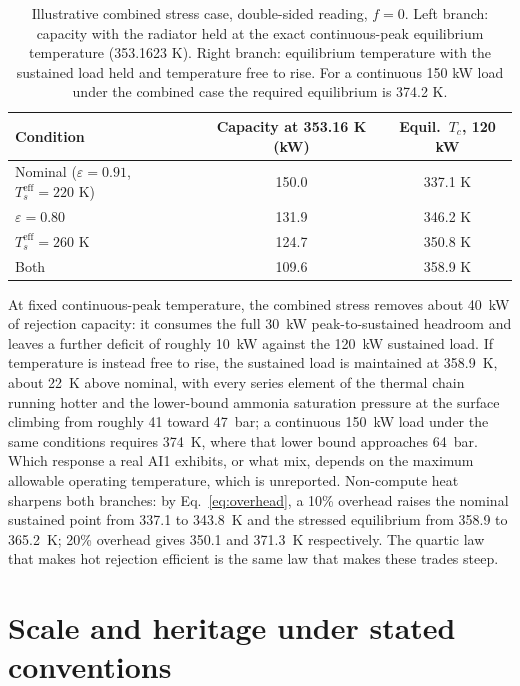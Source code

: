 \documentclass[11pt]{article}
\newcommand{\Tc}{T_c}
\newcommand{\Ts}{T_s^{\mathrm{eff}}}
\newcommand{\eps}{\varepsilon}
\begin{document}
\begin{table}[h]
\centering
\begin{tabular}{lcc}
\toprule
Condition & Capacity at 353.16 K (kW) & Equil.\ $\Tc$, 120 kW \\
\midrule
Nominal ($\eps=0.91$, $\Ts=220$ K) & 150.0 & 337.1 K \\
$\eps = 0.80$ & 131.9 & 346.2 K \\
$\Ts = 260$ K & 124.7 & 350.8 K \\
Both & 109.6 & 358.9 K \\
\bottomrule
\end{tabular}
\caption{Illustrative combined stress case, double-sided reading, $f=0$. Left branch: capacity with the radiator held at the exact continuous-peak equilibrium temperature (353.1623 K). Right branch: equilibrium temperature with the sustained load held and temperature free to rise. For a continuous 150 kW load under the combined case the required equilibrium is 374.2 K.}
\label{tab:twobranch}
\end{table}

At fixed continuous-peak temperature, the combined stress removes about 40~kW of rejection capacity: it consumes the full 30~kW peak-to-sustained headroom and leaves a further deficit of roughly 10~kW against the 120~kW sustained load. If temperature is instead free to rise, the sustained load is maintained at 358.9~K, about 22~K above nominal, with every series element of the thermal chain running hotter and the lower-bound ammonia saturation pressure at the surface climbing from roughly 41 toward 47~bar; a continuous 150~kW load under the same conditions requires 374~K, where that lower bound approaches 64~bar. Which response a real AI1 exhibits, or what mix, depends on the maximum allowable operating temperature, which is unreported. Non-compute heat sharpens both branches: by Eq.~\eqref{eq:overhead}, a 10\% overhead raises the nominal sustained point from 337.1 to 343.8~K and the stressed equilibrium from 358.9 to 365.2~K; 20\% overhead gives 350.1 and 371.3~K respectively. The quartic law that makes hot rejection efficient is the same law that makes these trades steep.

\section{Scale and heritage under stated conventions}\label{sec:scaleup}
\end{document}
